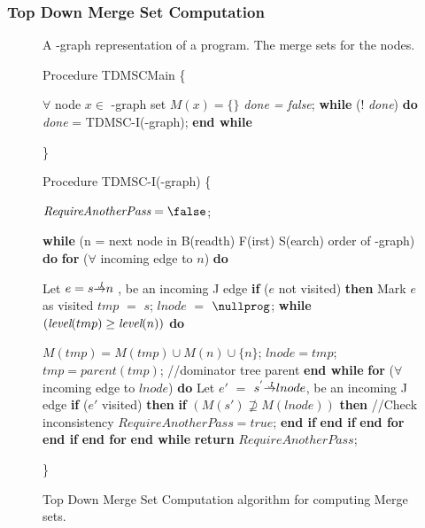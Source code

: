 {\subsubsection{Top Down Merge Set Computation}

\begin{figure}[!ht]
\centering
\begin{minipage}[t]{5in}
 A \DJ-graph representation of a program.
 The merge sets for the nodes.

\setcounter{linectr}{0}
Procedure TDMSCMain
\{
\begin{code}
 $\forall$ node $x \in$ \DJ-graph set $M(x) = \{\}$
 {\it done = false};
 {\bf while} (! {\it done}) {\bf do}
     {\it done} = TDMSC-I(\DJ-graph);
 {\bf end while}
\end{code}
\}

Procedure TDMSC-I(\DJ-graph)
\{
\begin{code}

 $\textit{RequireAnotherPass}=\false$;

 {\bf while} (n = next node in B(readth) F(irst) S(earch) order of \DJ-graph) {\bf do} \label{C:bfs}
      {\bf for} ($\forall$ incoming edge to $n$) {\bf do} \label{C:jedge}

          Let $e = s \st{J} n$ , be an incoming J edge
          {\bf if} ($e$ not visited) {\bf then}
              Mark $e$ as visited 
              $\textit{tmp}$ $=$ $s$;
              $\textit{lnode}$ $=$ $\nullprog$;
              {\bf while} $(\textit{level}(tmp)\ge \textit{level}(n))$ {\bf do} \label{C:mwhiles}

                   $M(tmp)=M(tmp)\cup M(n)\cup \{n\}$;
                   $lnode=tmp$;
                   $tmp=parent(tmp)$; //dominator tree parent
              {\bf end while} \label{C:mwhilee}
              {\bf for} ($\forall$ incoming edge to $lnode$) {\bf do} \label{C:lnode}
                  Let $e'$ $=$ $s^{'} \st{J} lnode$, be an incoming J edge
                  {\bf if} ($e'$ visited) {\bf then}
                     {\bf if} $(M(s') \not\supseteq M(lnode))$ {\bf then} //Check inconsistency
                         $RequireAnotherPass = true$;
                     {\bf end if}
                  {\bf end if}
              {\bf end for}
          {\bf end if}
     {\bf end for}
 {\bf end while}
 {\bf return} $RequireAnotherPass$;
\end{code}
\}
\end{minipage}
\caption{Top Down Merge Set Computation algorithm for computing Merge sets.}
\label{F:tdmsc}
\end{figure} 

}
